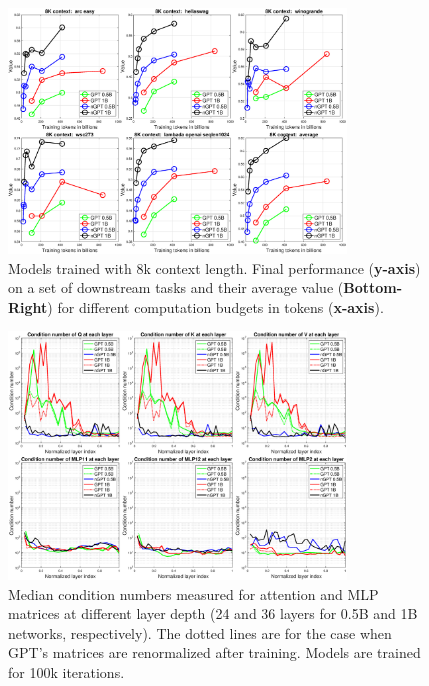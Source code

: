 \documentclass{article} %
\begin{document}
\begin{figure}[t]
\begin{center}
    \includegraphics[width=0.80\textwidth]{8Ktasks.eps} 
\caption{\label{fig:f3} Models trained with 8k context length. Final performance (\textbf{y-axis}) on a set of downstream tasks and their average value (\textbf{Bottom-Right}) for different computation budgets in tokens (\textbf{x-axis}).}
\label{figure_scalingTasks8k}
\end{center}
\end{figure}
\clearpage
\begin{figure}[t]
\begin{center}
    \includegraphics[width=0.8\textwidth]{condnums_denorm.eps} 
\caption{\label{fig_conddenorm} Median condition numbers measured for attention and MLP matrices at different layer depth (24 and 36 layers for 0.5B and 1B networks, respectively). The dotted lines are for the case when GPT's matrices are renormalized after training. Models are trained for 100k iterations.}
\end{center}
\end{figure}
\end{document}
